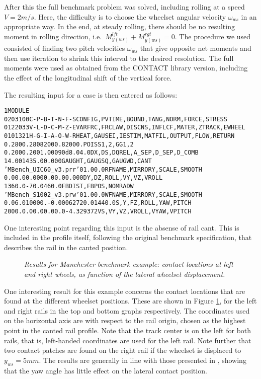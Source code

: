 \documentclass[12pt]{report}
\begin{document}
After this the full benchmark problem was solved, including rolling at a
speed $V=2\unit{m/s}$. Here, the difficulty is to choose the wheelset angular
velocity $\omega_{ws}$ in an appropriate way. In the end, at steady
rolling, there should be no resulting moment in rolling direction, i.e.\
$M_{y(ws)}^{lft} + M_{y(ws)}^{rgt} =0$. The procedure we used consisted
of finding two pitch velocities $\omega_{ws}$ that give opposite net
moments and then use iteration to shrink this interval to the desired
resolution. The full moments were used as obtained from the CONTACT library
version, including the effect of the longitudinal shift of the vertical
force.

The resulting input for a case is then entered as follows:
\begin{alltt}\small
% 13: Lateral displacement  6.0 mm, yaw angle 14.4 mrad

  1 MODULE
 0203100    C-P-B-T-N-F-S   CONFIG, PVTIME, BOUND,  TANG,   NORM,   FORCE,  STRESS
 0122033    V-L-D-C-M-Z-E   VARFRC, FRCLAW, DISCNS, INFLCF, MATER,  ZTRACK, EWHEEL
 0101321    H-G-I-A-O-W-R     HEAT, GAUSEI, IESTIM, MATFIL, OUTPUT, FLOW,   RETURN
  0.280   0.280   82000.  82000.                 POISS 1,2,  GG 1,2
  0.200   0.200   1.000   90d   8.0   4.0        DX, DS, DQREL, A\_SEP,D\_SEP,D\_COMB
   14.0     0    1435.0   0.000                  GAUGHT, GAUGSQ, GAUGWD, CANT
  'MBench\_UIC60\_v3.prr'   0     1.0   0.0        RFNAME, MIRRORY, SCALE, SMOOTH
     0.0    0.0   0.000   0.0   0.0   0.000      DY, DZ, ROLL, VY, VZ, VROLL
  1360.0  -70.0   460.0                          FBDIST, FBPOS, NOMRADW
  'MBench\_S1002\_v3.prw'   0     1.0   0.0        WFNAME, MIRRORY, SCALE, SMOOTH
  0.0  6.0  10000. -0.0006272  0.0144  0.0       S,  Y,  FZ, ROLL,  YAW,  PITCH
 2000. 0.0    0.0   0.0        0.0    -4.329372  VS, VY, VZ, VROLL, VYAW, VPITCH
\end{alltt}
One interesting point regarding this input is the absense of rail cant. This
is included in the profile itself, following the original benchmark
specification, that describes the rail in the canted position.

\begin{figure}[bt]
\centering
{}
\caption{\em Results for Manchester benchmark example: contact locations at
left and right wheels, as function of the lateral wheelset displacement.}
\label{fig:mbench_cpos}
\end{figure}

One interesting result for this example concerns the contact locations that
are found at the different wheelset positions. These are shown in Figure
\ref{fig:mbench_cpos}, for the left and right rails in the top and bottom
graphs respectively. The coordinates used on the horizontal axis are with
respect to the rail origin, chosen as the highest point in the canted rail
profile. Note that the track center is on the left for both rails, that is,
left-handed coordinates are used for the left rail. Note further that two
contact patches are found on the right rail if the wheelset is displaced to
$y_{ws}=5\unit{mm}$. The results are generally in line with those presented in
\cite{Shackleton2008}, showing that the yaw angle has little effect on the
lateral contact position.
\end{document}
